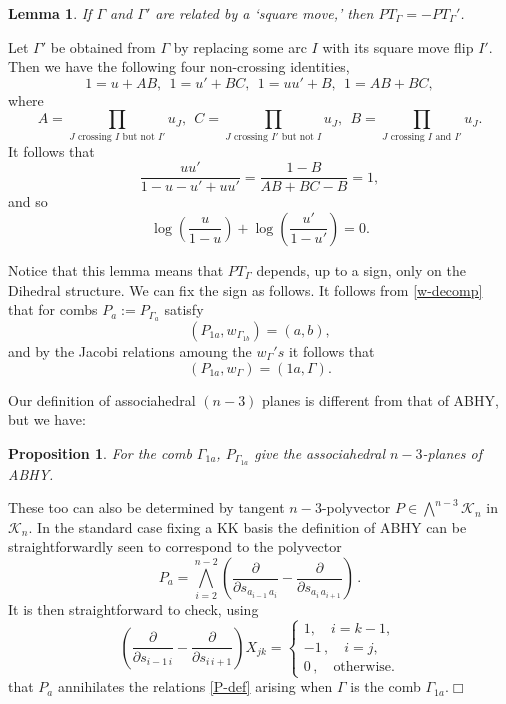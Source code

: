 \documentclass[11pt]{article}
\newcommand{\p}{\partial}
\newcommand{\cK}{\mathcal{K}}
\newcommand{\1}{{\rm 1\hskip-0.25em I}}
\newcommand{\proof}{ \noindent {\bf Proof:} }
\newtheorem{propn}{Proposition}[section]
\newtheorem{lemma}{Lemma}[section]
\begin{document}
\begin{lemma}
If $\Gamma$ and $\Gamma'$ are related by a `square move,' then $PT_\Gamma = - PT_\Gamma'$. 
\end{lemma}

\proof
Let $\Gamma'$ be obtained from $\Gamma$ by replacing some arc $I$ with its square move flip $I'$. Then we have the following four non-crossing identities,
$$
1 = u + AB,~~1=u'+BC,~~1 = uu' + B,~~1 = AB+BC,
$$
where
$$
A = \prod_{J\text{ crossing } I \text{ but not } I'}u_J,~~C = \prod_{J\text{ crossing } I' \text{ but not } I}u_J, ~~B = \prod_{J\text{ crossing } I \text{ and } I'}u_J.
$$
It follows that
$$
\frac{uu'}{1-u-u'+uu'} = \frac{1-B}{AB+BC-B} = 1,
$$
and so
$$
\log\left(\frac{u}{1-u}\right)+\log\left(\frac{u'}{1-u'}\right) = 0.
$$

Notice that this lemma means that $PT_\Gamma$ depends, up to a sign, only on the Dihedral structure. We can fix the sign as follows. It follows from \eqref{w-decomp} that for combs $P_a:=P_{\Gamma_a}$ satisfy 
\begin{equation}
(P_{1a},w_{\Gamma_{1b}}) = (a,b),
\end{equation}
and by the Jacobi relations amoung the $w_\Gamma's$ it follows that
$$
(P_{1a},w_\Gamma) = (1a,\Gamma).
$$

Our definition of associahedral $(n-3)$ planes is different from that of ABHY, but we have:

\begin{propn}  For the comb $\Gamma_{1a}$, $P_{\Gamma_{1a}}$ give the associahedral $n-3$-planes of ABHY.
\end{propn}

\proof These too can also be determined by  tangent $n-3$-polyvector $P\in \bigwedge^{n-3}\cK_n$ in $\cK_n$.  In the standard case fixing a KK basis the definition of ABHY can be straightforwardly seen to correspond to the polyvector 
\begin{equation}
P_{a }=\bigwedge_{i=2}^{n-2}\left( \frac{\p}{\p s_{a_{i-1}\, a_i}}-\frac{\p}{\p s_{a_i\,a_{i+1}}}\right)\, .
\end{equation}
It is then straightforward to check, using 
\begin{equation}
\left( \frac{\p}{\p s_{i-1\, i}}-\frac{\p}{\p s_{i\,i+1}}\right)X_{jk}=\begin{cases} 1, \quad i=k-1,\\
-1\, , \quad i=j,\\
0\, , \quad \mbox{otherwise.}
\end{cases}
\end{equation}
that $P_a$ annihilates the relations \eqref{P-def} arising when $\Gamma$ is the comb $\Gamma_{1a}$.$\Box$
\end{document}
